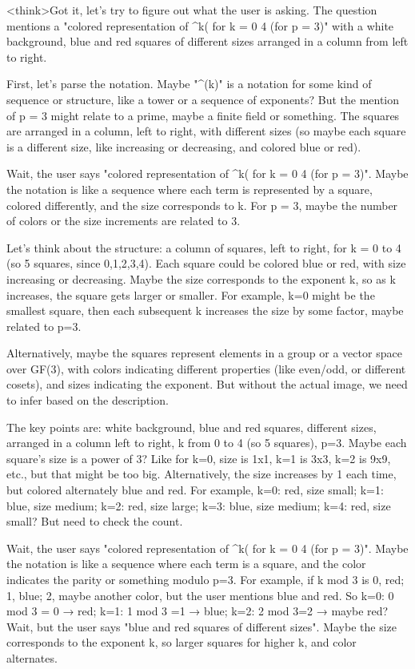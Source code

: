 <think>Got it, let's try to figure out what the user is asking. The question mentions a "colored representation of ^k( for k = 0 4 (for p = 3)" with a white background, blue and red squares of different sizes arranged in a column from left to right. 

First, let's parse the notation. Maybe "^(k)" is a notation for some kind of sequence or structure, like a tower or a sequence of exponents? But the mention of p = 3 might relate to a prime, maybe a finite field or something. The squares are arranged in a column, left to right, with different sizes (so maybe each square is a different size, like increasing or decreasing, and colored blue or red). 

Wait, the user says "colored representation of ^k( for k = 0 4 (for p = 3)". Maybe the notation is like a sequence where each term is represented by a square, colored differently, and the size corresponds to k. For p = 3, maybe the number of colors or the size increments are related to 3. 

Let's think about the structure: a column of squares, left to right, for k = 0 to 4 (so 5 squares, since 0,1,2,3,4). Each square could be colored blue or red, with size increasing or decreasing. Maybe the size corresponds to the exponent k, so as k increases, the square gets larger or smaller. For example, k=0 might be the smallest square, then each subsequent k increases the size by some factor, maybe related to p=3. 

Alternatively, maybe the squares represent elements in a group or a vector space over GF(3), with colors indicating different properties (like even/odd, or different cosets), and sizes indicating the exponent. But without the actual image, we need to infer based on the description. 

The key points are: white background, blue and red squares, different sizes, arranged in a column left to right, k from 0 to 4 (so 5 squares), p=3. Maybe each square's size is a power of 3? Like for k=0, size is 1x1, k=1 is 3x3, k=2 is 9x9, etc., but that might be too big. Alternatively, the size increases by 1 each time, but colored alternately blue and red. For example, k=0: red, size small; k=1: blue, size medium; k=2: red, size large; k=3: blue, size medium; k=4: red, size small? But need to check the count. 

Wait, the user says "colored representation of ^k( for k = 0 4 (for p = 3)". Maybe the notation is like a sequence where each term is a square, and the color indicates the parity or something modulo p=3. For example, if k mod 3 is 0, red; 1, blue; 2, maybe another color, but the user mentions blue and red. So k=0: 0 mod 3 = 0 → red; k=1: 1 mod 3 =1 → blue; k=2: 2 mod 3=2 → maybe red? Wait, but the user says "blue and red squares of different sizes". Maybe the size corresponds to the exponent k, so larger squares for higher k, and color alternates. 

